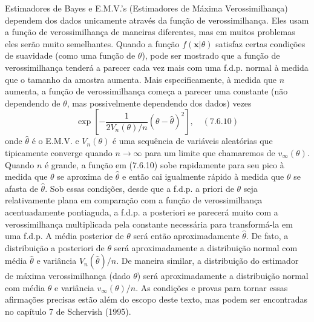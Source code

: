 Estimadores de Bayes e E.M.V.'s (Estimadores de Máxima Verossimilhança) dependem dos dados unicamente através da função de verossimilhança. Eles usam a função de verossimilhança de maneiras diferentes, mas em muitos problemas eles serão muito semelhantes. Quando a função $f(\mathbf{x}|\theta)$ satisfaz certas condições de suavidade (como uma função de $\theta$), pode ser mostrado que a função de verossimilhança tenderá a parecer cada vez mais com uma f.d.p. normal à medida que o tamanho da amostra aumenta. Mais especificamente, à medida que $n$ aumenta, a função de verossimilhança começa a parecer uma constante (não dependendo de $\theta$, mas possivelmente dependendo dos dados) vezes
$$ \exp\left[-\frac{1}{2V_n(\theta)/n}(\theta - \hat{\theta})^2\right], \quad (7.6.10) $$
onde $\hat{\theta}$ é o E.M.V. e $V_n(\theta)$ é uma sequência de variáveis aleatórias que tipicamente converge quando $n \to \infty$ para um limite que chamaremos de $v_\infty(\theta)$. Quando $n$ é grande, a função em (7.6.10) sobe rapidamente para seu pico à medida que $\theta$ se aproxima de $\hat{\theta}$ e então cai igualmente rápido à medida que $\theta$ se afasta de $\hat{\theta}$. Sob essas condições, desde que a f.d.p. a priori de $\theta$ seja relativamente plana em comparação com a função de verossimilhança acentuadamente pontiaguda, a f.d.p. a posteriori se parecerá muito com a verossimilhança multiplicada pela constante necessária para transformá-la em uma f.d.p. A média posterior de $\theta$ será então aproximadamente $\hat{\theta}$. De fato, a distribuição a posteriori de $\theta$ será aproximadamente a distribuição normal com média $\hat{\theta}$ e variância $V_n(\hat{\theta})/n$. De maneira similar, a distribuição do estimador de máxima verossimilhança (dado $\theta$) será aproximadamente a distribuição normal com média $\theta$ e variância $v_\infty(\theta)/n$. As condições e provas para tornar essas afirmações precisas estão além do escopo deste texto, mas podem ser encontradas no capítulo 7 de Schervish (1995).

